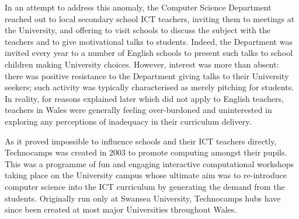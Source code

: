 \documentclass{sig-alternate}
\begin{document}
In an attempt to address this anomaly,
the Computer Science Department reached out
to local secondary school ICT teachers,
inviting them to meetings at the University,
and offering to visit schools to discuss
the subject with the teachers and to give
motivational talks to students.
Indeed, the Department was invited every year to
a number of English schools to present such talks
to school children making University choices.
However, interest was more than absent:
there was positive resistance to the Department
giving talks to their University seekers;
such activity was typically characterised as merely pitching for students.
In reality, for reasons explained later
which did not apply to English teachers,
teachers in Wales were generally feeling over-burdoned and
uninterested in exploring any perceptions
of inadequacy in their curriculum delivery.

As it proved impossible to influence schools and their ICT teachers directly,
Technocamps was created in 2003 to promote computing amongst their pupils.
This was a programme of fun and engaging interactive computational workshops
taking place on the University campus
whose ultimate aim was to re-introduce computer science into
the ICT curriculum by generating the demand from the students.
Originally run only at Swansea University,
Technocamps hubs have since been created at most major Universities
throughout Wales.
\end{document}
